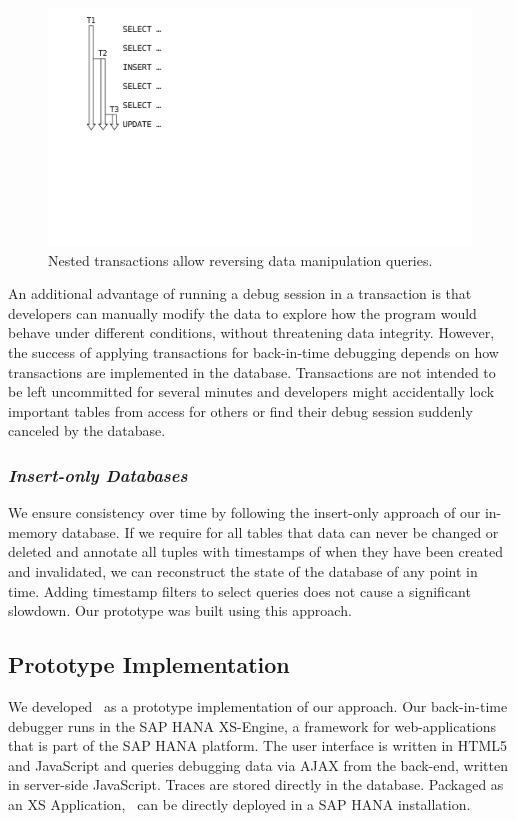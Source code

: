 \begin{figure}[t]
\centering
\includegraphics[width=0.3\linewidth]{img/bit_transactions}
\caption{Nested transactions allow reversing data manipulation queries.}
\label{fig:bit_transactions}
\end{figure}

An additional advantage of running a debug session in a transaction is that developers can manually modify the data to explore how the program would behave under different conditions, without threatening data integrity.
However, the success of applying transactions for back-in-time debugging depends on how transactions are implemented in the database.
Transactions are not intended to be left uncommitted for several minutes and developers might accidentally lock important tables from access for others or find their debug session suddenly canceled by the database.

\subsubsection*{\emph{Insert-only Databases}}

\tmpStart

We ensure consistency over time by following the insert-only approach of our in-memory database.
If we require for all tables that data can never be changed or deleted and annotate all tuples with timestamps of when they have been created and invalidated, we can reconstruct the state of the database of any point in time.
Adding timestamp filters to select queries does not cause a significant slowdown.
Our prototype was built using this approach.

\subsection{Prototype Implementation}

We developed \tool\ as a prototype implementation of our approach.
Our back-in-time debugger runs in the SAP HANA XS-Engine, a framework for web-applications that is part of the SAP HANA platform.
The user interface is written in HTML5 and JavaScript and queries debugging data via AJAX from the back-end, written in server-side JavaScript.
Traces are stored directly in the database.
Packaged as an XS Application, \tool\ can be directly deployed in a SAP HANA installation.

